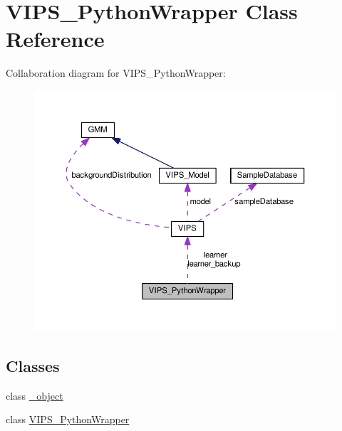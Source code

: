 \hypertarget{classVIPS__PythonWrapper}{}\section{V\+I\+P\+S\+\_\+\+Python\+Wrapper Class Reference}
\label{classVIPS__PythonWrapper}


Collaboration diagram for V\+I\+P\+S\+\_\+\+Python\+Wrapper\+:\nopagebreak
\begin{figure}[H]
\begin{center}
\leavevmode
\includegraphics[width=350pt]{classVIPS__PythonWrapper__coll__graph}
\end{center}
\end{figure}
\subsection*{Classes}
\begin{DoxyCompactItemize}
\item 
class \hyperlink{classVIPS__PythonWrapper_1_1__object}{\+\_\+object}
\item 
class \hyperlink{classVIPS__PythonWrapper_1_1VIPS__PythonWrapper}{V\+I\+P\+S\+\_\+\+Python\+Wrapper}
\end{DoxyCompactItemize}
